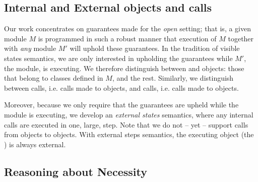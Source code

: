 


\subsection{Internal and External objects and calls}
\label{s:concepts}

Our work concentrates on guarantees made for the \emph{open} setting; that is, a given module
$M$ is programmed in such a robust manner
 that execution of $M$ together with \emph{any} \externalM 
module $M'$ will uphold these guarantees. In the tradition of
visible states semantics, we are  only interested in upholding the guarantees while 
$M'$, the  \externalM module,  is executing.   
 We therefore distinguish between \emph{\internalO} and
\emph{\externalO} objects: those that belong to classes defined in $M$, and the rest. Similarly, we 
distinguish between \emph{\internalC} calls, i.e. calls made %
 to \internalO objects, and \emph{\externalC} calls, i.e. calls made %
 to \externalC objects. %


Moreover, because we only require that the guarantees are upheld while 
  the  \externalM module  is executing, we develop an \emph{external states} semantics, where
 any internal calls are executed in one, large, step.
 Note that we do not -- yet -- support calls from
\internalO objects to \externalO objects.
 With external steps semantics,  the executing object (the ) is always   external. 
 


\subsection{Reasoning about Necessity}
\label{s:approach}
 
